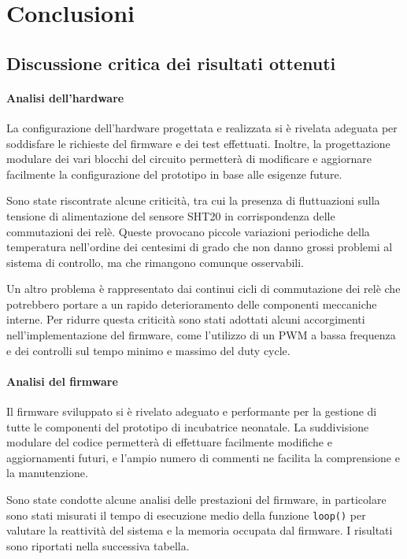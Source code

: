 \chapter{Conclusioni}
\section{Discussione critica dei risultati ottenuti}
\subsubsection{Analisi dell'hardware}
La configurazione dell'hardware progettata e realizzata si è rivelata adeguata per soddisfare le richieste del firmware e
dei test effettuati. Inoltre, la progettazione modulare dei vari blocchi del circuito permetterà di modificare e aggiornare
facilmente la configurazione del prototipo in base alle esigenze future.

Sono state riscontrate alcune criticità, tra cui la presenza di fluttuazioni sulla tensione di alimentazione del sensore SHT20
in corrispondenza delle commutazioni dei relè. Queste provocano piccole variazioni periodiche della temperatura nell'ordine dei
centesimi di grado che non danno grossi problemi al sistema di controllo, ma che rimangono comunque osservabili.

Un altro problema è rappresentato dai continui cicli di commutazione dei relè che potrebbero portare a un rapido
deterioramento delle componenti meccaniche interne. Per ridurre questa criticità sono stati adottati alcuni accorgimenti
nell'implementazione del firmware, come l'utilizzo di un PWM a bassa frequenza e dei controlli sul tempo minimo e massimo
del duty cycle.

\subsubsection{Analisi del firmware}
Il firmware sviluppato si è rivelato adeguato e performante per la gestione di tutte le componenti del prototipo di incubatrice
neonatale. La suddivisione modulare del codice permetterà di effettuare facilmente modifiche e aggiornamenti futuri, e l'ampio
numero di commenti ne facilita la comprensione e la manutenzione.

Sono state condotte alcune analisi delle prestazioni del firmware, in particolare sono stati misurati il tempo di esecuzione medio
della funzione \verb|loop()| per valutare la reattività del sistema e la memoria occupata dal firmware. I risultati sono riportati
nella successiva tabella.

